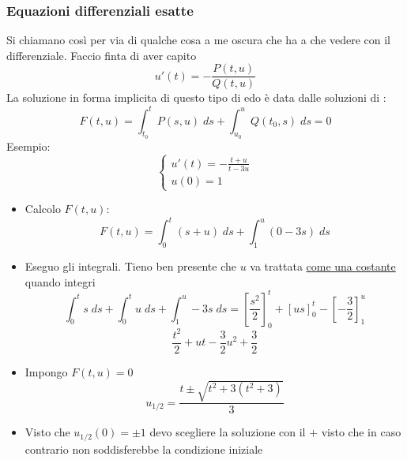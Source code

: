 \subsubsection*{Equazioni differenziali esatte}
Si chiamano così per via di qualche cosa a me oscura che ha a che vedere con il differenziale. Faccio finta di aver capito
\[
	u'\left( t \right) = - \frac{P\left( t,u \right) }{Q \left( t,u \right) }
\]
La soluzione in forma implicita di questo tipo di edo è data dalle soluzioni di :
\[
	F\left( t,u \right) = \int_{t_0}^{t} P\left( s,u \right)  \; ds + \int_{u_0}^{u} Q\left( t_0,s \right)  \; ds =0
\]
Esempio:
\[
	\begin{cases}
		u'\left( t \right) =\displaystyle -\frac{t+u}{t-3u} \\
		u\left( 0 \right) =1
	\end{cases}
\]
\begin{itemize}
	\item Calcolo $ F\left( t,u \right)  $:
	      \[
		      F\left( t,u \right) = \int_{0}^{t} \left( s+u \right)  \; ds + \int_{1}^{u} \left( 0-3s \right)   \; ds
	      \]
	\item Eseguo gli integrali. Tieno ben presente che $ u $ va trattata \underline{come una costante} quando integri
	      \[
		      \int_{0}^{t} s \; ds + \int_{0}^{t} u \; ds + \int_{1}^{u} -3s \; ds = \left[ \frac{s^2}{2} \right] _0 ^{t} + \left[ us \right] _0 ^{t} - \left[ -\frac{3}{2} \right] _1 ^{u}
	      \]
	      \[
		      \frac{t^2}{2} + ut - \frac{3}{2}u^2 + \frac{3}{2}
	      \]
	\item Impongo $ F\left( t,u \right)  =0$
	      \[
		      u_{1 / 2}= \frac{t \pm \sqrt{t^2 + 3\left( t^2 + 3 \right) } }{3}
	      \]
	\item Visto che $ u_{1/2}\left( 0 \right) = \pm 1 $ devo scegliere la soluzione con il $ + $ visto che in caso contrario non soddisferebbe la condizione iniziale
\end{itemize}
